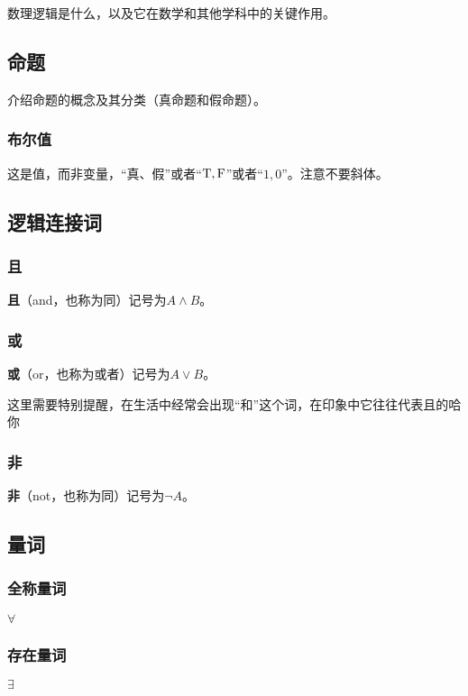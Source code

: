 
\begin{issues}
\issueDraft
\end{issues}
数理逻辑是什么，以及它在数学和其他学科中的关键作用。
\subsection{命题}
介绍命题的概念及其分类（真命题和假命题）。
\subsubsection{布尔值}
这是值，而非变量，“真、假”或者“${\rm T,F}$”或者“$1,0$”。注意不要斜体。
\subsection{逻辑连接词}
\subsubsection{且}
\textbf{且}（and，也称为同）记号为$A\land B$。
\subsubsection{或}
\textbf{或}（or，也称为或者）记号为$A\lor B$。

这里需要特别提醒，在生活中经常会出现“和”这个词，在印象中它往往代表且的哈你
\subsubsection{非}
\textbf{非}（not，也称为同）记号为$\lnot A$。
\subsection{量词}
\subsubsection{全称量词}
$\forall$
\subsubsection{存在量词}
$\exists$
